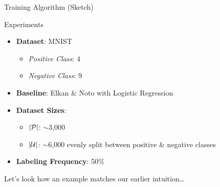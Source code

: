 \documentclass[11pt,dvipsnames,usenames,aspectratio=169]{beamer}  %
\DeclarePairedDelimiter{\abs}{\lvert}{\rvert}
\newcommand{\pos}{\mathcal{P}}
\newcommand{\unlabel}{\mathcal{U}}
\newcommand{\blue}[1]{{\color{Blue} #1}}
\begin{document}
\begin{frame}{Training Algorithm (Sketch)}
  
\end{frame}

\begin{frame}{Experiments}
  \begin{itemize}
    \setlength{\itemsep}{16pt}
    \item \blue{\textbf{Dataset}}: MNIST
      \begin{itemize}
        \item \textit{Positive Class}: $4$
        \item \textit{Negative Class}: $9$
      \end{itemize}
    \item \blue{\textbf{Baseline}}: Elkan \& Noto with Logistic Regression
    \item \blue{\textbf{Dataset Sizes}}:
      \begin{itemize}
        \item $\abs{\pos}$: ${\sim}$3,000
        \item $\abs{\unlabel}$: ${\sim}$6,000 evenly split between positive \& negative classes
      \end{itemize}
    \item \blue{\textbf{Labeling Frequency}}: 50\%
  \end{itemize}

  \vspace{16pt}
  Let's look how an example matches our earlier intuition\ldots
\end{frame}
\end{document}
